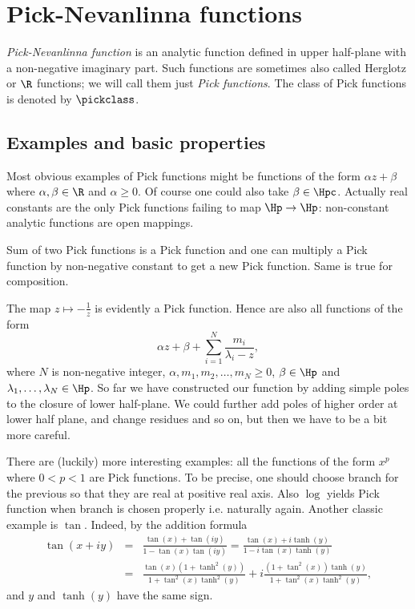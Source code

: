 \chapter{Pick-Nevanlinna functions}

\textit{Pick-Nevanlinna function} is an analytic function defined in upper half-plane with a non-negative imaginary part. Such functions are sometimes also called Herglotz or $\R$ functions; we will call them just \textit{Pick functions}. The class of Pick functions is denoted by $\pickclass$.

\section{Examples and basic properties}

Most obvious examples of Pick functions might be functions of the form $\alpha z + \beta$ where $\alpha, \beta \in \R$ and $\alpha \geq 0$. Of course one could also take $\beta \in \Hpc$. Actually real constants are the only Pick functions failing to map $\Hp \to \Hp$: non-constant analytic functions are open mappings.

Sum of two Pick functions is a Pick function and one can multiply a Pick function by non-negative constant to get a new Pick function. Same is true for composition.

The map $z \mapsto -\frac{1}{z}$ is evidently a Pick function. Hence are also all functions of the form
\[
	\alpha z + \beta + \sum_{i = 1}^{N} \frac{m_{i}}{\lambda_{i}- z},
\]
where $N$ is non-negative integer, $\alpha, m_{1}, m_{2}, \ldots, m_{N} \geq 0$, $\beta \in \Hp$ and $\lambda_{1}, \ldots, \lambda_{N} \in \Hp$. So far we have constructed our function by adding simple poles to the closure of lower half-plane. We could further add poles of higher order at lower half plane, and change residues and so on, but then we have to be a bit more careful.

There are (luckily) more interesting examples: all the functions of the form $x^{p}$ where $0 < p < 1$ are Pick functions. To be precise, one should choose branch for the previous so that they are real at positive real axis. Also $\log$ yields Pick function when branch is chosen properly i.e. naturally again. Another classic example is $\tan$. Indeed, by the addition formula
\begin{eqnarray*}
	\tan(x + i y) &=& \frac{\tan(x) + \tan(i y)}{1 - \tan(x) \tan(i y)} = \frac{\tan(x) + i \tanh(y)}{1 - i \tan(x) \tanh(y)} \\
	&=& \frac{\tan(x)(1 + \tanh^2(y))}{1 + \tan^2(x) \tanh^2(y)} + i \frac{(1 + \tan^2(x))\tanh(y)}{1 + \tan^2(x) \tanh^2(y)},
\end{eqnarray*}
and $y$ and $\tanh(y)$ have the same sign.

